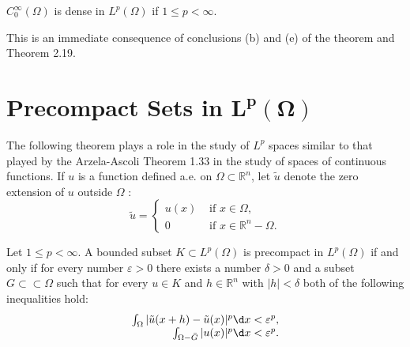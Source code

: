 \begin{corollary}
  $C_0^{\infty}(\Omega)$ is dense in $L^p(\Omega)$ if $1 \leq p<\infty$.
\end{corollary}

This is an immediate consequence of conclusions (b) and (e) of the theorem and Theorem 2.19.


\section[Precompact Sets in $L^p(\Omega)$]{Precompact Sets in $\bm{L^p(\Omega)}$}


\begin{para}
  The following theorem plays a role in the study of $L^p$ spaces similar to that played by the Arzela-Ascoli Theorem 1.33 in the study of spaces of continuous functions. If $u$ is a function defined a.e. on $\Omega \subset \mathbb{R}^n$, let $\tilde{u}$ denote the zero extension of $u$ outside $\Omega$ :
  \[
  \tilde{u} =
  \begin{cases}
    u(x) & \text { if } x \in \Omega, \\ 
    0 & \text { if } x \in \mathbb{R}^n-\Omega.
  \end{cases}
  \]
\end{para}

\begin{theorem}
  Let $1 \leq p<\infty$. A bounded subset $K \subset L^p(\Omega)$ is precompact in $L^p(\Omega)$ if and only if for every number $\varepsilon>0$ there exists a number $\delta>0$ and a subset $G \subset\subset \Omega$ such that for every $u \in K$ and $h \in \mathbb{R}^n$ with $|h|<\delta$ both of the following inequalities hold:
  \[
  \begin{array}{r}
  \int_{\Omega}|\tilde{u}(x+h)-\tilde{u}(x)|^p \d x<\varepsilon^p, \\
  \int_{\Omega-\bar{G}}|u(x)|^p \d x<\varepsilon^p .
  \end{array}
  \]
\end{theorem}


